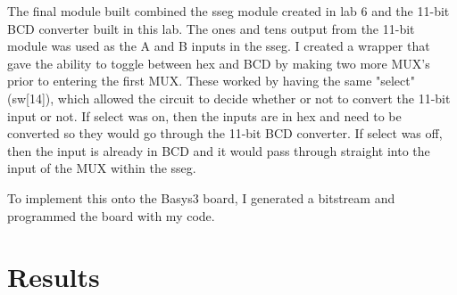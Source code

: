 \documentclass[11pt]{article}
\begin{document}
The final module built combined the sseg module created in lab 6 and the 11-bit BCD converter built in this lab. The ones and tens output from the 11-bit module was used as the A and B inputs in the sseg. I created a wrapper that gave the ability to toggle between hex and BCD by making two more MUX's prior to entering the first MUX. These worked by having the same "select" (sw[14]), which allowed the circuit to decide whether or not to convert the 11-bit input or not. If select was on, then the inputs are in hex and need to be converted so they would go through the 11-bit BCD converter. If select was off, then the input is already in BCD and it would pass through straight into the input of the MUX within the sseg. 

To implement this onto the Basys3 board, I generated a bitstream and programmed the board with my code.

\FloatBarrier

\section*{Results}
\end{document}
